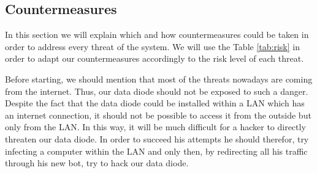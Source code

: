 \documentclass[a4paper,10pt]{article}
\begin{document}
\subsection{Countermeasures}
In this section we will explain which and how countermeasures could be taken in order to address every threat of the system. We will use the Table \ref{tab:risk} in order to adapt our countermeasures accordingly to the risk level of each threat.

Before starting, we should mention that most of the threats nowadays are coming from the internet. Thus, our data diode should not be exposed to such a danger. Despite the fact that the data diode could be installed within a LAN which has an internet connection, it should not be possible to access it from the outside but only from the LAN. In this way, it will be much difficult for a hacker to directly threaten our data diode. In order to succeed his attempts he should therefor, try infecting a computer within the LAN and only then, by redirecting all his traffic through his new bot, try to hack our data diode.
\end{document}
